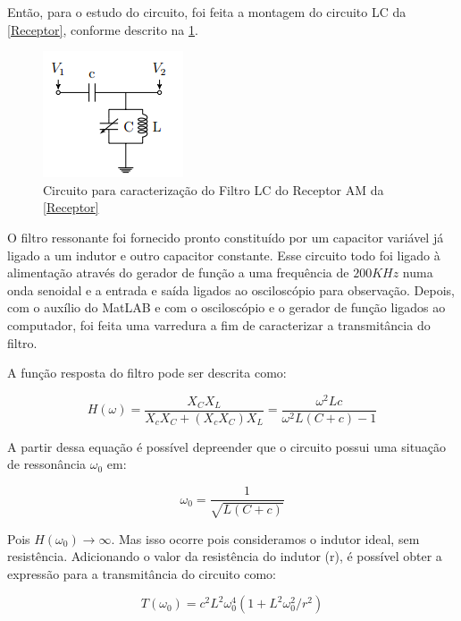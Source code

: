 \documentclass[11pt,a4paper]{article}
\begin{document}
    Então, para o estudo do circuito, foi feita a montagem do circuito LC da \cref{Receptor}, conforme descrito na \cref{FiltroLC}.
    
        \begin{figure}[!htb]
        \centering
        \includegraphics[scale=0.7]{FiltroLC.png}
        \caption{Circuito para caracterização do Filtro LC do Receptor AM da \cref{Receptor}}
        \label{FiltroLC}
        \end{figure}
    
    O filtro ressonante foi fornecido pronto constituído por um capacitor variável já ligado a um indutor e outro capacitor constante. Esse circuito todo foi ligado à alimentação através do gerador de função a uma frequência de $200KHz$ numa onda senoidal e a entrada e saída ligados ao osciloscópio para observação. Depois, com o auxílio do MatLAB e com o osciloscópio e o gerador de função ligados ao computador, foi feita uma varredura a fim de caracterizar a transmitância do filtro.
    
    A função resposta do filtro pode ser descrita como:
    
        \begin{equation}
            H(\omega) = \dfrac{X_C X_L}{X_cX_C + (X_c X_C)X_L} = \dfrac{\omega ^2 Lc}{\omega ^2L(C + c)-1}
            \label{eqTransmitanciaFiltroLC}
        \end{equation}
        
    A partir dessa equação é possível depreender que o circuito possui uma situação de ressonância $\omega _0$ em:
    
        \begin{equation}
            \omega _0 = \dfrac{1}{\sqrt{L(C+c)}}
            \label{eqRessonancia}
        \end{equation}
        
    Pois $H(\omega _0) \rightarrow \infty$. Mas isso ocorre pois consideramos o indutor ideal, sem resistência. Adicionando o valor da resistência do indutor (r), é possível obter a expressão para a transmitância do circuito como:
    
        \begin{equation}
            T(\omega _0) = c^2 L^2 \omega _0 ^4(1+L^2 \omega_0 ^2/r^2)
        \end{equation}
    
\end{document}
